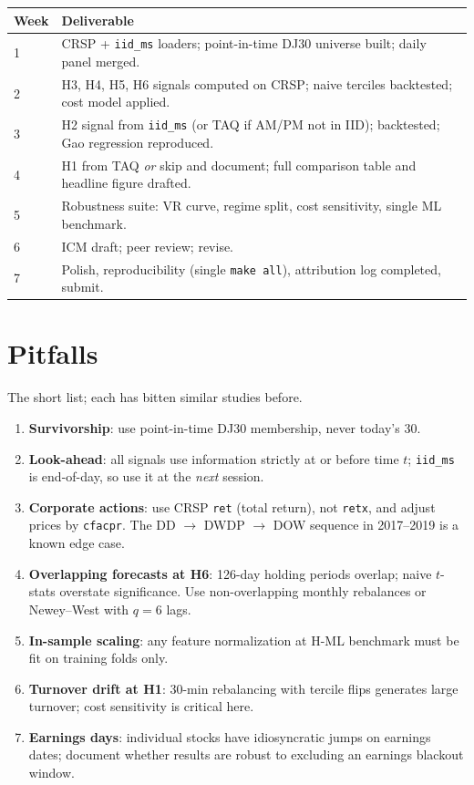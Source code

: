 \documentclass[11pt,letterpaper]{article}
\begin{document}
\begin{table}[H]
\centering
\small
\begin{tabularx}{\linewidth}{@{}l X@{}}
\toprule
\textbf{Week} & \textbf{Deliverable}\\
\midrule
1 & CRSP + \texttt{iid\_ms} loaders; point-in-time DJ30 universe built; daily panel merged.\\
2 & H3, H4, H5, H6 signals computed on CRSP; naive terciles backtested; cost model applied.\\
3 & H2 signal from \texttt{iid\_ms} (or TAQ if AM/PM not in IID); backtested; Gao regression reproduced.\\
4 & H1 from TAQ \emph{or} skip and document; full comparison table and headline figure drafted.\\
5 & Robustness suite: VR curve, regime split, cost sensitivity, single ML benchmark.\\
6 & ICM draft; peer review; revise.\\
7 & Polish, reproducibility (single \texttt{make all}), attribution log completed, submit.\\
\bottomrule
\end{tabularx}
\end{table}

\section{Pitfalls}\label{sec:pitfalls}

The short list; each has bitten similar studies before.

\begin{enumerate}[leftmargin=*]
  \item \textbf{Survivorship}: use point-in-time DJ30 membership, never today's 30.
  \item \textbf{Look-ahead}: all signals use information strictly at or before time $t$; \texttt{iid\_ms} is end-of-day, so use it at the \emph{next} session.
  \item \textbf{Corporate actions}: use CRSP \texttt{ret} (total return), not \texttt{retx}, and adjust prices by \texttt{cfacpr}. The DD $\to$ DWDP $\to$ DOW sequence in 2017--2019 is a known edge case.
  \item \textbf{Overlapping forecasts at H6}: 126-day holding periods overlap; naive $t$-stats overstate significance. Use non-overlapping monthly rebalances or Newey--West with $q=6$ lags.
  \item \textbf{In-sample scaling}: any feature normalization at H-ML benchmark must be fit on training folds only.
  \item \textbf{Turnover drift at H1}: 30-min rebalancing with ter\-cile flips generates large turnover; cost sensitivity is critical here.
  \item \textbf{Earnings days}: individual stocks have idiosyncratic jumps on earnings dates; document whether results are robust to excluding an earnings blackout window.
\end{enumerate}
\end{document}
